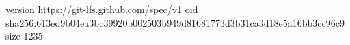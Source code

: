 version https://git-lfs.github.com/spec/v1
oid sha256:613ed9b04ea3bc39920b002503b949d81681773d3b31ca3d18e5a16bb3cc96c9
size 1235
